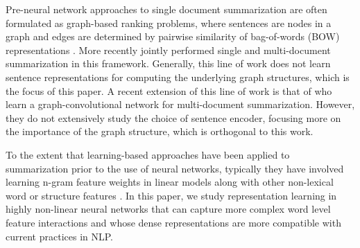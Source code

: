 
Pre-neural network
approaches to single document summarization
are often formulated as graph-based ranking problems, where
sentences are nodes in a graph and edges are determined by pairwise 
similarity of bag-of-words (BOW) representations 
\cite{erkan2004lexrank,mihalcea2005language}. 
More recently \citet{wan2010towards}
jointly performed single and multi-document summarization in this framework. 
Generally, this line of work does not learn sentence representations for 
computing the underlying graph structures, which is the focus of this paper.
%
A recent extension of this line of work is that of
\citet{yasunaga2017graph}
who
learn a graph-convolutional network for
multi-document summarization. However, they do not extensively  study the 
choice of sentence encoder, focusing more on the importance of the 
graph structure, which is orthogonal to this work.

To the extent that learning-based approaches have been applied
to summarization prior to the use of neural networks, typically they have involved learning n-gram feature weights 
in linear models along with other non-lexical word or 
structure features 
\cite{berg2011jointly,sipos2012large,durrett2016learning}.
In this paper, we study representation learning in highly non-linear
neural networks that can capture more complex word level feature interactions
and whose dense representations are more compatible with current practices
in NLP.

